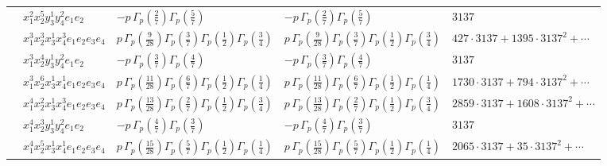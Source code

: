 \documentclass[11pt]{article}
\begin{document}
\begin{table}[ht]
{\begin{tabular}{@{}lllll@{}}
 & $x_{1}^{2} x_{2}^{5} y_{3}^{1} y_{4}^{2} e_{1} e_{2}$ & $- p \, \Gamma_p \left( \frac{2}{7} \right) \Gamma_p \left( \frac{5}{7} \right)$ & $- p \, \Gamma_p \left( \frac{2}{7} \right) \Gamma_p \left( \frac{5}{7} \right)$ & $3137$ \\
 & $x_{1}^{3} x_{2}^{3} x_{3}^{1} x_{4}^{3}  e_{1} e_{2} e_{3} e_{4}$ & $p \, \Gamma_p \left( \frac{9}{28} \right) \Gamma_p \left( \frac{3}{7} \right) \Gamma_p \left( \frac{1}{2} \right) \Gamma_p \left( \frac{3}{4} \right)$ & $p \, \Gamma_p \left( \frac{9}{28} \right) \Gamma_p \left( \frac{3}{7} \right) \Gamma_p \left( \frac{1}{2} \right) \Gamma_p \left( \frac{3}{4} \right)$ & $427{\cdot}3137{+}1395{\cdot}3137^{2}{+}\cdots$ \\
 & $x_{1}^{3} x_{2}^{4} y_{3}^{1} y_{4}^{2} e_{1} e_{2}$ & $- p \, \Gamma_p \left( \frac{3}{7} \right) \Gamma_p \left( \frac{4}{7} \right)$ & $- p \, \Gamma_p \left( \frac{3}{7} \right) \Gamma_p \left( \frac{4}{7} \right)$ & $3137$ \\
 & $x_{1}^{3} x_{2}^{6} x_{3}^{1} x_{4}^{1}  e_{1} e_{2} e_{3} e_{4}$ & $p \, \Gamma_p \left( \frac{11}{28} \right) \Gamma_p \left( \frac{6}{7} \right) \Gamma_p \left( \frac{1}{2} \right) \Gamma_p \left( \frac{1}{4} \right)$ & $p \, \Gamma_p \left( \frac{11}{28} \right) \Gamma_p \left( \frac{6}{7} \right) \Gamma_p \left( \frac{1}{2} \right) \Gamma_p \left( \frac{1}{4} \right)$ & $1730{\cdot}3137{+}794{\cdot}3137^{2}{+}\cdots$ \\
 & $x_{1}^{4} x_{2}^{2} x_{3}^{1} x_{4}^{3}  e_{1} e_{2} e_{3} e_{4}$ & $p \, \Gamma_p \left( \frac{13}{28} \right) \Gamma_p \left( \frac{2}{7} \right) \Gamma_p \left( \frac{1}{2} \right) \Gamma_p \left( \frac{3}{4} \right)$ & $p \, \Gamma_p \left( \frac{13}{28} \right) \Gamma_p \left( \frac{2}{7} \right) \Gamma_p \left( \frac{1}{2} \right) \Gamma_p \left( \frac{3}{4} \right)$ & $2859{\cdot}3137{+}1608{\cdot}3137^{2}{+}\cdots$ \\
 & $x_{1}^{4} x_{2}^{3} y_{3}^{1} y_{4}^{2} e_{1} e_{2}$ & $- p \, \Gamma_p \left( \frac{4}{7} \right) \Gamma_p \left( \frac{3}{7} \right)$ & $- p \, \Gamma_p \left( \frac{4}{7} \right) \Gamma_p \left( \frac{3}{7} \right)$ & $3137$ \\
 & $x_{1}^{4} x_{2}^{5} x_{3}^{1} x_{4}^{1}  e_{1} e_{2} e_{3} e_{4}$ & $p \, \Gamma_p \left( \frac{15}{28} \right) \Gamma_p \left( \frac{5}{7} \right) \Gamma_p \left( \frac{1}{2} \right) \Gamma_p \left( \frac{1}{4} \right)$ & $p \, \Gamma_p \left( \frac{15}{28} \right) \Gamma_p \left( \frac{5}{7} \right) \Gamma_p \left( \frac{1}{2} \right) \Gamma_p \left( \frac{1}{4} \right)$ & $2065{\cdot}3137{+}35{\cdot}3137^{2}{+}\cdots$ \\

\end{tabular}}
\end{table}
\end{document}
